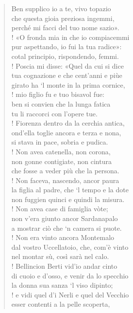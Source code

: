 \documentclass[a4paper, twoside, titlepage]{book}
\begin{document}
\begin{verse}
Ben supplico io a te, vivo topazio\\
che questa gioia preziosa ingemmi,\\
perché mi facci del tuo nome sazio».\\!
«O fronda mia in che io compiacemmi\\
pur aspettando, io fui la tua radice»:\\
cotal principio, rispondendo, femmi.\\!
Poscia mi disse: «Quel da cui si dice\\
tua cognazione e che cent’anni e piùe\\
girato ha ‘l monte in la prima cornice,\\!
mio figlio fu e tuo bisavol fue:\\
ben si convien che la lunga fatica\\
tu li raccorci con l’opere tue.\\!
Fiorenza dentro da la cerchia antica,\\
ond’ella toglie ancora e terza e nona,\\
si stava in pace, sobria e pudica.\\!
Non avea catenella, non corona,\\
non gonne contigiate, non cintura\\
che fosse a veder più che la persona.\\!
Non faceva, nascendo, ancor paura\\
la figlia al padre, che ‘l tempo e la dote\\
non fuggien quinci e quindi la misura.\\!
Non avea case di famiglia vòte;\\
non v’era giunto ancor Sardanapalo\\
a mostrar ciò che ‘n camera si puote.\\!
Non era vinto ancora Montemalo\\
dal vostro Uccellatoio, che, com’è vinto\\
nel montar sù, così sarà nel calo.\\!
Bellincion Berti vid’io andar cinto\\
di cuoio e d’osso, e venir da lo specchio\\
la donna sua sanza ‘l viso dipinto;\\!
e vidi quel d’i Nerli e quel del Vecchio\\
esser contenti a la pelle scoperta,\\

\end{verse}
\end{document}
